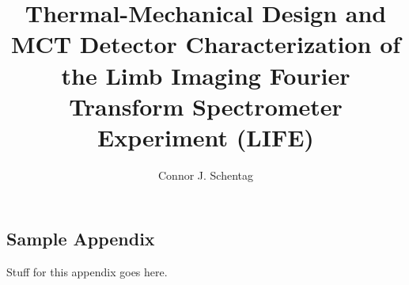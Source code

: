 \documentclass[12pt, proposal, subfigure]{uofsthesis-cs}
\title{Thermal-Mechanical Design and MCT Detector Characterization of the Limb Imaging Fourier Transform Spectrometer Experiment (LIFE)}
\author{Connor J. Schentag}
\begin{document}
\maketitle

\frontmatter








%

\uofsappendix

\begin{appendices}

\chapter{Sample Appendix}

Stuff for this appendix goes here.

\end{appendices}
\end{document}
